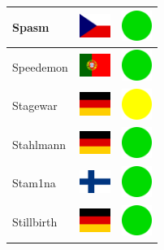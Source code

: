 \documentclass[12pt, a4paper, twoside]{report}
\begin{document}
\begin{center}
\begin{longtable}{|p{5cm}|p{2cm}|p{2cm}|}
			Spasm & \includegraphics[width=1cm]{4x3/cz} & \includegraphics[width=1cm]{likes/y} \\ \hline
			Speedemon & \includegraphics[width=1cm]{4x3/pt} & \includegraphics[width=1cm]{likes/y} \\ \hline
			Stagewar & \includegraphics[width=1cm]{4x3/de} & \includegraphics[width=1cm]{likes/m} \\ \hline
			Stahlmann & \includegraphics[width=1cm]{4x3/de} & \includegraphics[width=1cm]{likes/y} \\ \hline
			Stam1na & \includegraphics[width=1cm]{4x3/fi} & \includegraphics[width=1cm]{likes/y} \\ \hline
			Stillbirth & \includegraphics[width=1cm]{4x3/de} & \includegraphics[width=1cm]{likes/y} \\ \hline

\end{longtable}
\end{center}
\end{document}
